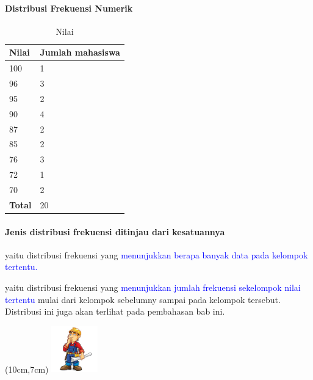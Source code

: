\documentclass[main.tex]{subfiles}
\begin{document}
\begin{frame}[c]
	\framesubtitle{Distribusi Frekuensi Numerik}
	\begin{table}[htb]
		\caption{Nilai}
		\begin{tabular}{ll}
			\hline
			Nilai           &  Jumlah mahasiswa  \\
			\hline
			100             &  1  \\
			96              &  3  \\
			95              &  2  \\
			90              &  4  \\
			87              &  2  \\
			85              &  2  \\
			76              &  3  \\
			72              &  1  \\
			70              &  2  \\
			\hline
			\textbf{Total}  &  20  \\
		\end{tabular}
	\end{table}
\end{frame}

\begin{frame}[c]
	\framesubtitle{Jenis distribusi frekuensi ditinjau dari kesatuannya}
	\begin{description}
		\item<1->[Distribusi frekuensi satuan] yaitu distribusi frekuensi yang \textcolor{blue}{menunjukkan berapa banyak data pada kelompok tertentu.}
		\item<2->[Distribusi frekuensi kumulatif] yaitu distribusi frekuensi yang \textcolor{blue}{menunjukkan jumlah frekuensi sekelompok nilai tertentu} mulai dari kelompok sebelumny sampai pada kelompok tersebut. Distribusi ini juga akan terlihat pada pembahasan bab ini.
	\end{description}
	\begin{textblock*}{2cm}(10cm,7cm) %
		\includegraphics[width=2cm]{figures/cons}
	\end{textblock*}


\end{frame}
\end{document}
